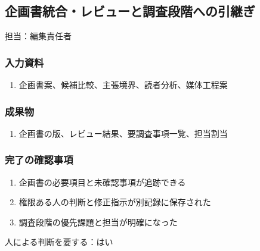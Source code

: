 \documentclass[a4paper,11pt]{article}
\begin{document}
\subsection{企画書統合・レビューと調査段階への引継ぎ}
\par 担当：編集責任者\par\medskip
\subsubsection*{入力資料}
\begin{enumerate}[leftmargin=2em,itemsep=0.35em]
\item 企画書案、候補比較、主張境界、読者分析、媒体工程案
\end{enumerate}
\subsubsection*{成果物}
\begin{enumerate}[leftmargin=2em,itemsep=0.35em]
\item 企画書の版、レビュー結果、要調査事項一覧、担当割当
\end{enumerate}
\subsubsection*{完了の確認事項}
\begin{enumerate}[leftmargin=2em,itemsep=0.35em]
\item 企画書の必要項目と未確認事項が追跡できる
\item 権限ある人の判断と修正指示が別記録に保存された
\item 調査段階の優先課題と担当が明確になった
\end{enumerate}
\par 人による判断を要する：はい\par\medskip
\end{document}
